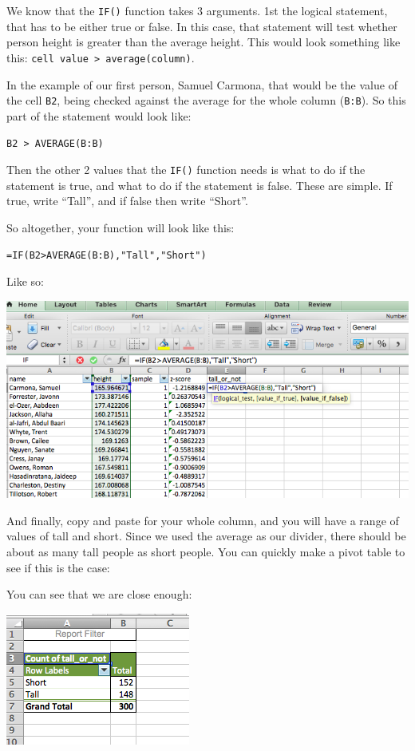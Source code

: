 \documentclass[
]{book}
\begin{document}
We know that the \texttt{IF()} function takes 3 arguments. 1st the logical statement, that has to be either true or false. In this case, that statement will test whether person height is greater than the average height. This would look something like this: \texttt{cell\ value\ \textgreater{}\ average(column)}.

In the example of our first person, Samuel Carmona, that would be the value of the cell \texttt{B2}, being checked against the average for the whole column (\texttt{B:B}). So this part of the statement would look like:

\texttt{B2\ \textgreater{}\ AVERAGE(B:B)}

Then the other 2 values that the \texttt{IF()} function needs is what to do if the statement is true, and what to do if the statement is false. These are simple. If true, write ``Tall'', and if false then write ``Short''.

So altogether, your function will look like this:

\texttt{=IF(B2\textgreater{}AVERAGE(B:B),"Tall","Short")}

Like so:

\includegraphics{imgs/ifelse_tallshort.png}

And finally, copy and paste for your whole column, and you will have a range of values of tall and short. Since we used the average as our divider, there should be about as many tall people as short people. You can quickly make a pivot table to see if this is the case:

You can see that we are close enough:

\includegraphics{imgs/tallshort_pivot.png}
\end{document}
